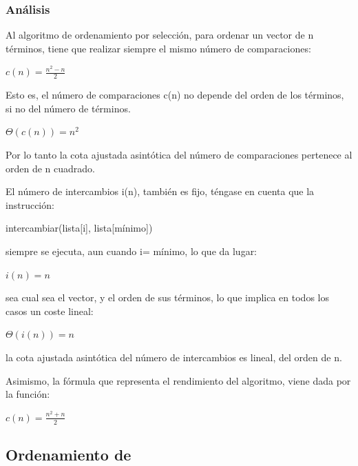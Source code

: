 \documentclass[8pt, A4]{article}    %
\begin{document}
\subsubsection{Análisis}
 
Al algoritmo de ordenamiento por selección, para ordenar un vector de n términos, tiene que realizar siempre el mismo número de comparaciones:

\begin{center}
${\displaystyle c(n)={\frac {n^{2}-n}{2}}}$
\end{center}

Esto es, el número de comparaciones c(n) no depende del orden de los términos, si no del número de términos.

\begin{center}
    ${\displaystyle \Theta (c(n))=n^{2}\;}$
\end{center}

Por lo tanto la cota ajustada asintótica del número de comparaciones pertenece al orden de n cuadrado.

El número de intercambios i(n), también es fijo, téngase en cuenta que la instrucción:

\begin{center}
    intercambiar(lista[i], lista[mínimo])
\end{center}

siempre se ejecuta, aun cuando i= mínimo, lo que da lugar:

\begin{center}
    ${\displaystyle i(n)=n\;}$
\end{center}

sea cual sea el vector, y el orden de sus términos, lo que implica en todos los casos un coste lineal:

\begin{center}
    ${\displaystyle \Theta (i(n))=n\;}$
\end{center}

la cota ajustada asintótica del número de intercambios es lineal, del orden de n.

Asimismo, la fórmula que representa el rendimiento del algoritmo, viene dada por la función:

\begin{center}
    ${\displaystyle c(n)={\frac {n^{2}+n}{2}}}$
\end{center}

\newpage


\subsection{Ordenamiento de }
\end{document}
